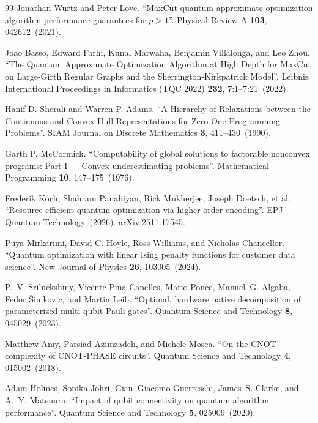 \begin{thebibliography}{99}
Jonathan Wurtz and Peter Love.
\newblock ``MaxCut quantum approximate optimization algorithm performance guarantees for $p>1$''.
\newblock Physical Review A {\bf 103}, 042612~(2021).


Joao Basso, Edward Farhi, Kunal Marwaha, Benjamin Villalonga, and Leo Zhou.
\newblock ``The Quantum Approximate Optimization Algorithm at High Depth for MaxCut on Large-Girth Regular Graphs and the Sherrington-Kirkpatrick Model''.
\newblock Leibniz International Proceedings in Informatics (TQC 2022) {\bf 232}, 7:1--7:21~(2022).


Hanif D. Sherali and Warren P. Adams.
\newblock ``A Hierarchy of Relaxations between the Continuous and Convex Hull Representations for Zero-One Programming Problems''.
\newblock SIAM Journal on Discrete Mathematics {\bf 3}, 411--430~(1990).


Garth P. McCormick.
\newblock ``Computability of global solutions to factorable nonconvex programs: Part I --- Convex underestimating problems''.
\newblock Mathematical Programming {\bf 10}, 147--175~(1976).



Frederik Koch, Shahram Panahiyan, Rick Mukherjee, Joseph Doetsch, et al.
\newblock ``Resource-efficient quantum optimization via higher-order encoding''.
\newblock EPJ Quantum Technology~(2026).
\newblock arXiv:2511.17545.

Puya Mirkarimi, David C. Hoyle, Ross Williams, and Nicholas Chancellor.
\newblock ``Quantum optimization with linear Ising penalty functions for customer data science''.
\newblock New Journal of Physics {\bf 26}, 103005~(2024).

P.~V. Sriluckshmy, Vicente Pina-Canelles, Mario Ponce, Manuel~G. Algaba, Fedor {\v S}imkovic, and Martin Leib.
\newblock ``Optimal, hardware native decomposition of parameterized multi-qubit Pauli gates''.
\newblock Quantum Science and Technology {\bf 8}, 045029~(2023).

Matthew Amy, Parsiad Azimzadeh, and Michele Mosca.
\newblock ``On the CNOT-complexity of CNOT-PHASE circuits''.
\newblock Quantum Science and Technology {\bf 4}, 015002~(2018).

Adam Holmes, Sonika Johri, Gian~Giacomo Guerreschi, James~S. Clarke, and A.~Y. Matsuura.
\newblock ``Impact of qubit connectivity on quantum algorithm performance''.
\newblock Quantum Science and Technology {\bf 5}, 025009~(2020).


\end{thebibliography}
